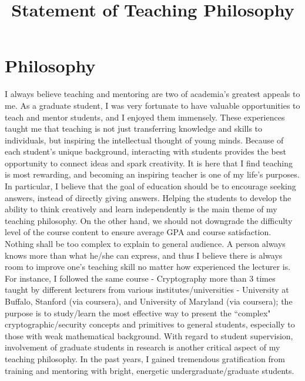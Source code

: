 \documentclass[11pt]{article}
\begin{document}
\title{Statement of Teaching Philosophy}
\author{}
\date{}
\maketitle

\section*{Philosophy} 

I always believe teaching and mentoring are two of academia's greatest appeals to me. As a graduate student, I was very fortunate to have valuable opportunities to teach and mentor students, and I enjoyed them immensely. These experiences taught me that teaching is not just transferring knowledge and skills to individuals, but inspiring the intellectual thought of young minds. Because of each student's unique background, interacting with students provides the best opportunity to connect ideas and spark creativity. It is here that I find teaching is most rewarding, and becoming an inspiring teacher is one of my life's purposes. In particular, I believe that the goal of education should be to encourage seeking answers, instead of directly giving answers. Helping the students to develop the ability to think creatively and learn independently is the main theme of my teaching philosophy. On the other hand, we should not downgrade the difficulty level of the course content to ensure average GPA and course satisfaction. Nothing shall be too complex to explain to general audience. A person always knows more than what he/she can express, and thus I believe there is always room to improve one's teaching skill no matter how experienced the lecturer is. For instance, I followed the same course - Cryptography more than 3 times taught by different lecturers from various institutes/universities - University at Buffalo, Stanford (via coursera), and University of Maryland (via coursera); the purpose is to study/learn the most effective way to present the ``complex" cryptographic/security concepts and primitives to general students, especially to those with weak mathematical background. With regard to student supervision, involvement of graduate students in research is another critical aspect of my teaching philosophy. In the past years, I gained tremendous gratification from training and mentoring with bright, energetic undergraduate/graduate students. 
\end{document}
